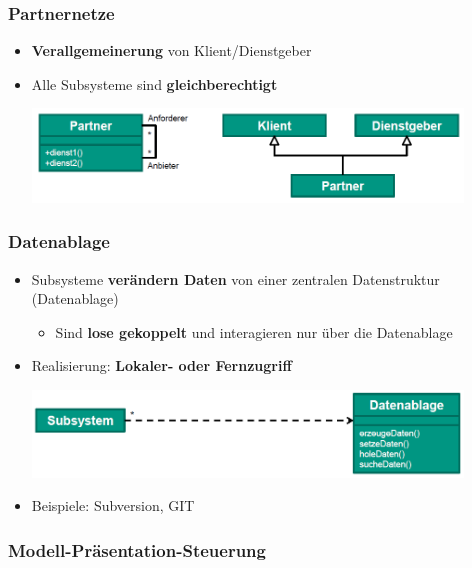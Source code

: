 \documentclass[parskip=full, 12pt]{scrartcl}
\begin{document}
			\subsubsection{Partnernetze}
			
				\begin{itemize}
					\item \textbf{Verallgemeinerung} von Klient/Dienstgeber
					\item Alle Subsysteme sind \textbf{gleichberechtigt}
					\begin{center}
						\includegraphics[width=0.9\textwidth]{../images/partnernetze.png}
					\end{center}
				\end{itemize}
			
			\subsubsection{Datenablage}
			
				\begin{itemize}
					\item Subsysteme \textbf{verändern Daten} von einer zentralen Datenstruktur (Datenablage)
					\begin{itemize}
						\item Sind \textbf{lose gekoppelt} und interagieren nur über die Datenablage
					\end{itemize}
					\item Realisierung: \textbf{Lokaler- oder Fernzugriff}
					\begin{center}
						\includegraphics[width=0.9\textwidth]{../images/datenablage.png}
					\end{center}
					\item Beispiele: Subversion, GIT
				\end{itemize}
	
			\subsubsection{Modell-Präsentation-Steuerung}
			
\end{document}
